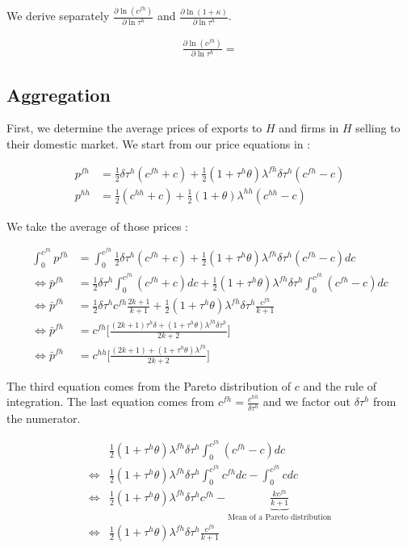 We derive separately $\frac{\partial \ln(c^{fh})}{\partial \ln \tau^h}$ and $\frac{\partial \ln(1+\kappa)}{\partial \ln \tau^h}$. 

\begin{align*}
    \frac{\partial \ln(c^{fh})}{\partial \ln \tau^h} = 
\end{align*}
\subsection{Aggregation}

First, we determine the average prices of exports to $H$ and firms in $H$ selling to their domestic market. We start from our price equations in : 

\begin{align*}
    p^{fh} &= \frac{1}{2}\delta \tau^h ( c^{fh} +  c) + \frac{1}{2} (1 + \tau^h\theta)\lambda^{fh}\delta \tau^h(c^{fh} - c)  \\
    p^{hh} &= \frac{1}{2}( c^{hh} +  c) + \frac{1}{2} (1 + \theta)\lambda^{hh}(c^{hh} - c)
\end{align*}

We take the average of those prices : 

\begin{align*}
    \int_{0}^{c^{fh}} p^{fh} &=  \int_{0}^{c^{fh}} \frac{1}{2}\delta \tau^h ( c^{fh} +  c) + \frac{1}{2} (1 + \tau^h\theta)\lambda^{fh}\delta \tau^h(c^{fh} - c) dc\\
    \Longleftrightarrow \bar{p}^{fh} &= \frac{1}{2}\delta \tau^h \int_{0}^{c^{fh}} ( c^{fh} +  c) dc+  \frac{1}{2} (1 + \tau^h\theta)\lambda^{fh}\delta \tau^h \int_{0}^{c^{fh}}(c^{fh} - c) dc\\
    \Longleftrightarrow \bar{p}^{fh} &= \frac{1}{2}\delta \tau^h c^{fh} \frac{2k +1}{k+1} + \frac{1}{2} (1 + \tau^h\theta)\lambda^{fh}\delta \tau^h \frac{c^{fh}}{k+1} \\
    \Longleftrightarrow \bar{p}^{fh} &= c^{fh} \Bigg[\frac{(2k +1)\tau^h\delta + (1 + \tau^h\theta)\lambda^{fh}\delta \tau^h}{2k+2} \Bigg] \\
    \Longleftrightarrow \bar{p}^{fh} &= c^{hh} \Bigg[\frac{(2k +1) + (1 + \tau^h\theta)\lambda^{fh}}{2k+2} \Bigg]
\end{align*}

The third equation comes from the Pareto distribution of $c$ and the rule of integration. The last equation comes from $c^{fh} = \frac{c^{hh}}{\delta \tau^h}$ and we factor out $\delta\tau^h$ from the numerator.

\begin{align*}
    &\frac{1}{2} (1 + \tau^h\theta)\lambda^{fh}\delta \tau^h \int_{0}^{c^{fh}}(c^{fh} - c) dc \\
    \Longleftrightarrow & \frac{1}{2} (1 + \tau^h\theta)\lambda^{fh}\delta \tau^h \int_{0}^{c^{fh}} c^{fh} dc -\int_{0}^{c^{fh}} c dc \\
    \Longleftrightarrow &\frac{1}{2} (1 + \tau^h\theta)\lambda^{fh}\delta \tau^h c^{fh} - \underbrace{\frac{kc^{fh}}{k+1}}_{\text{Mean of a Pareto distribution}} \\
    \Longleftrightarrow &\frac{1}{2} (1 + \tau^h\theta)\lambda^{fh}\delta \tau^h \frac{c^{fh}}{k+1}
\end{align*}

